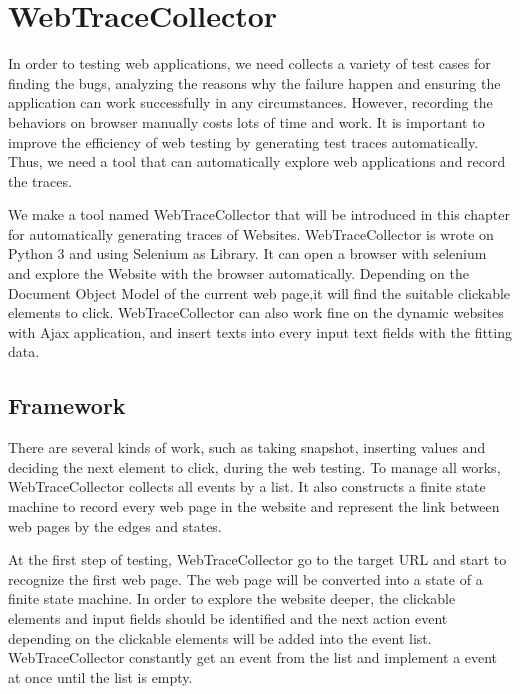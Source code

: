 
\chapter{WebTraceCollector}\label{ch:traceCollector}

In order to testing web applications,
we need collects a variety of test cases 
for finding the bugs, analyzing the reasons why the failure happen 
and ensuring the application can work successfully in any circumstances.
However, recording the behaviors on browser manually costs lots of time and work.
It is important to improve the efficiency of web testing by generating test traces automatically.
Thus, we need a tool that can automatically explore web applications and record the traces.

We make a tool named WebTraceCollector that will be introduced in this chapter for automatically generating traces of Websites.
WebTraceCollector is wrote on Python 3 and using Selenium as Library.
It can open a browser with selenium and explore the Website with the browser automatically.
Depending on the Document Object Model\cite{DOM} of the current web page,it will find the suitable clickable elements to click.
WebTraceCollector can also work fine on the dynamic websites with Ajax\cite{ajax} application,
and insert texts into every input text fields with the fitting data.


\section{Framework}

There are several kinds of work,
such as taking snapshot, inserting values and deciding the next element to click, during the web testing.
To manage all works, WebTraceCollector collects all events by a list.
It also constructs a finite state machine to record every web page in the website 
and represent the link between web pages by the edges and states.

At the first step of testing, WebTraceCollector go to the target URL and start to recognize the first web page.
The web page will be converted into a state of a finite state machine.
In order to explore the website deeper,
the clickable elements and input fields should be identified and 
the next action event depending on the clickable elements will be added into the event list.
WebTraceCollector constantly get an event from the list
and implement a event at once until the list is empty.

